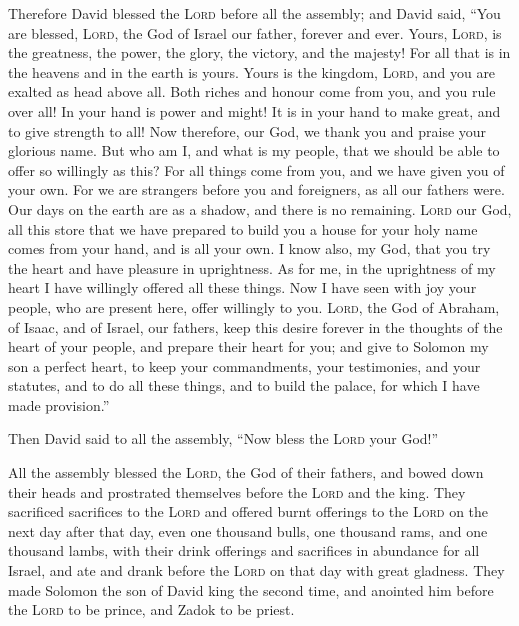  Therefore David blessed the \textsc{Lord} before all the
assembly; and David said, ``You are blessed, \textsc{Lord}, the God of
Israel our father, forever and ever.  Yours,
\textsc{Lord}, is the greatness, the power, the glory, the victory, and
the majesty! For all that is in the heavens and in the earth is yours.
Yours is the kingdom, \textsc{Lord}, and you are exalted as head above
all.  Both riches and honour come from you, and you rule
over all! In your hand is power and might! It is in your hand to make
great, and to give strength to all!  Now therefore, our
God, we thank you and praise your glorious name.  But who
am I, and what is my people, that we should be able to offer so
willingly as this? For all things come from you, and we have given you
of your own.  For we are strangers before you and
foreigners, as all our fathers were. Our days on the earth are as a
shadow, and there is no remaining.  \textsc{Lord} our
God, all this store that we have prepared to build you a house for your
holy name comes from your hand, and is all your own.  I
know also, my God, that you try the heart and have pleasure in
uprightness. As for me, in the uprightness of my heart I have willingly
offered all these things. Now I have seen with joy your people, who are
present here, offer willingly to you.  \textsc{Lord}, the
God of Abraham, of Isaac, and of Israel, our fathers, keep this desire
forever in the thoughts of the heart of your people, and prepare their
heart for you;  and give to Solomon my son a perfect
heart, to keep your commandments, your testimonies, and your statutes,
and to do all these things, and to build the palace, for which I have
made provision.''

 Then David said to all the assembly, ``Now bless the
\textsc{Lord} your God!''

All the assembly blessed the \textsc{Lord}, the God of their fathers,
and bowed down their heads and prostrated themselves before the
\textsc{Lord} and the king.  They sacrificed sacrifices
to the \textsc{Lord} and offered burnt offerings to the \textsc{Lord} on
the next day after that day, even one thousand bulls, one thousand rams,
and one thousand lambs, with their drink offerings and sacrifices in
abundance for all Israel,  and ate and drank before the
\textsc{Lord} on that day with great gladness. They made Solomon the son
of David king the second time, and anointed him before the \textsc{Lord}
to be prince, and Zadok to be priest.

